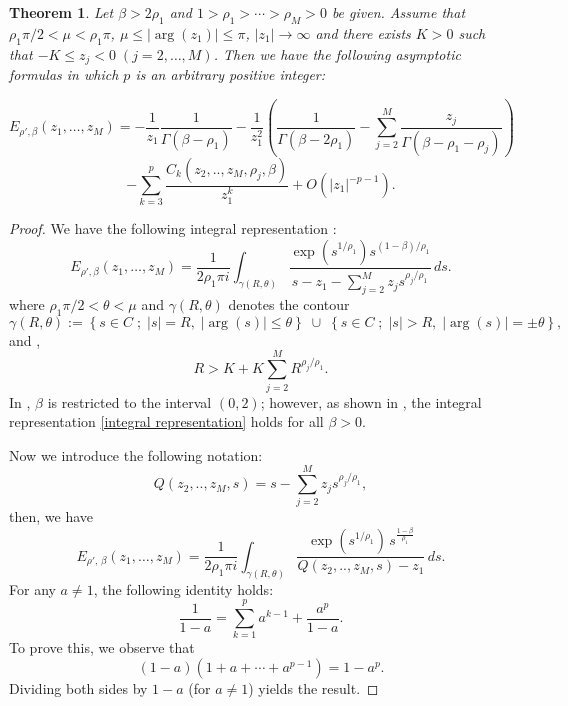 \documentclass[12pt, reqno]{amsart}
\newtheorem{theorem}{Theorem}[section]
\theoremstyle{definition}
\theoremstyle{remark}
\numberwithin{equation}{section}
\begin{document}
\begin{theorem}\label{Mitta-Leffler}
 Let $ \beta > 2\rho_1$ and $1 > \rho_1 > \cdots > \rho_M > 0$ be given. 
Assume that $\rho_1 \pi/2 < \mu < \rho_1 \pi$, 
$\mu \le |\arg(z_1)| \le \pi$, $|z_1|\to\infty$
and there exists $K > 0$ such that $-K \le z_j < 0 \; (j = 2, \ldots, M)$. Then we have the following asymptotic formulas in which $p$ is an arbitrary positive integer:

$$
E_{{\rho}',\beta}(z_1, \ldots, z_M)=-\frac{1}{z_1}\frac{1}{\Gamma(\beta-\rho_1)}-\frac{1}{z_1^2}\left(\frac{1}{\Gamma(\beta-2\rho_1)}-
\sum_{j=2}^{M}
\frac{z_j}{\Gamma(\beta-\rho_1-\rho_j)}\right)$$
$$
-\sum_{k=3}^p \frac{C_k(z_2,..,z_M,\rho_j,\beta)}{z_1^k}+O\left(|z_1|^{-p-1}\right).
$$
\end{theorem}
\begin{proof}
We have the following integral representation \cite{22}:
\begin{equation}\label{integral representation}
E_{{\rho}',\beta}(z_1,\ldots,z_M)
=
\frac{1}{2\rho_1 \pi i}
\int_{\gamma(R,\theta)}
\frac{
\exp(s^{1/\rho_1})
s^{(1-\beta)/\rho_1}
}{
s
-
z_1
-
\sum_{j=2}^{M}
z_j s^{\rho_j/\rho_1}
}
\, ds.
\end{equation}
where $\rho_1 \pi/2 < \theta < \mu$
and $\gamma(R,\theta)$ denotes the contour
\[
\gamma(R,\theta)
:=
\left\{
s \in {C}
\; ; \;
|s| = R,\; |\arg(s)| \le \theta
\right\}
\;\cup\;
\left\{
s \in {C}
\; ; \;
|s| > R,\; |\arg(s)| = \pm \theta
\right\},\] and , 
\[
R > K + K \sum_{j=2}^{M} R^{\rho_j / \rho_1}.
\]
In \cite{22}, $\beta$ is restricted to the interval $(0,2)$; however, as shown in \cite{26}, the integral representation \eqref{integral representation} holds for all $\beta>0$.

Now we introduce the following notation:
$$
Q(z_2,..,z_M,s)=s  - \displaystyle\sum_{j=2}^{M} z_j s^{\rho_j/\rho_1}, 
$$
then, we have
$$
E_{{\rho}', \,\beta}(z_1, \ldots, z_M)
=
\frac{1}{2\rho_1 \pi i}
\int_{\gamma(R,\theta)}
\frac{
\exp\!\left(s^{1/\rho_1}\right)
\, s^{\frac{1-\beta}{\rho_1}}
}{
Q(z_2,..,z_M,s)-z_1
}
\, ds.
$$
For any \( a \neq 1 \), the following identity holds:
\[
\frac{1}{1-a}
=
\sum_{k=1}^{p} a^{k-1}
+
\frac{a^p}{1-a}.
\]
To prove this, we observe that
\[
(1-a)\left(1 + a+ \cdots + a^{p-1}\right)
=
1 - a^p.
\]
Dividing both sides by \(1-a\) (for \(a \neq 1\)) yields the result.



\end{proof}
\end{document}
